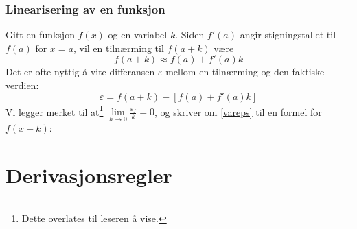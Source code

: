 \subsubsection{Linearisering av en funksjon}
Gitt en funksjon $ f(x) $ og en variabel $ k $. Siden $ f'(a) $ angir stigningstallet til $ f(a) $ for $ x=a $, vil en tilnærming til $ f(a+k) $ være
\[ f(a+k)\approx f(a)+f'(a)k \]
Det er ofte nyttig å vite differansen $ \varepsilon $ mellom en tilnærming og den faktiske verdien:
\begin{equation}\label{vareps}
	\varepsilon = f(a+k)-\left[f(a)+f'(a)k\right]
\end{equation}
Vi legger merket til at\footnote{Dette overlates til leseren å vise.} $ \lim\limits_{h\to0}\frac{\varepsilon_f}{k} =0 $, og skriver om \eqref{vareps} til en formel for $ f(x+k) $: \regv
{}

\section{Derivasjonsregler}
